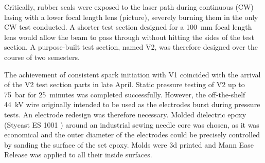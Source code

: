 Critically, rubber seals were exposed to the laser path during continuous (CW) lasing with a lower focal length lens (picture), severely burning them in the only CW test conducted. A shorter test section designed for a \qty{100}{mm} focal length lens would allow the beam to pass through without hitting the sides of the test section. A purpose-built test section, named V2, was therefore designed over the course of two semesters. 

The achievement of consistent spark initiation with V1 coincided with the arrival of the V2 test section parts in late April. Static pressure testing of V2 up to \qty{75}{bar} for \qty{25}{minutes} was completed successfully. However, the off-the-shelf \qty{44}{kV} wire originally intended to be used as the electrodes burst during pressure tests. An electrode redesign was therefore necessary. Molded dielectric epoxy (Stycast ES 1001 \textcite{McMasterCarr}) around an industrial sewing needle core was chosen, as it was economical and the outer diameter of the electrodes could be precisely controlled by sanding the surface of the set epoxy. Molds were 3d printed and Mann Ease Release was applied to all their inside surfaces.

